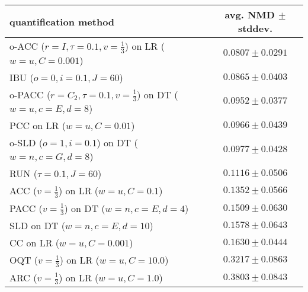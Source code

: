 \begin{tabular}{lc}
  \toprule
  quantification method & avg. NMD $\pm$ stddev. \\
  \midrule
  o-ACC ($r=I, \tau=0.1, v=\frac{1}{3}$) on LR ($w=u, C=0.001$) & $\mathbf{0.0807 \pm 0.0291}$ \\
  IBU ($o=0, i=0.1, J=60$) & $0.0865 \pm 0.0403$ \\
  o-PACC ($r=C_2, \tau=0.1, v=\frac{1}{3}$) on DT ($w=u, c=E, d=8$) & $0.0952 \pm 0.0377$ \\
  PCC on LR ($w=u, C=0.01$) & $0.0966 \pm 0.0439$ \\
  o-SLD ($o=1, i=0.1$) on DT ($w=n, c=G, d=8$) & $0.0977 \pm 0.0428$ \\
  RUN ($\tau=0.1, J=60$) & $0.1116 \pm 0.0506$ \\
  ACC ($v=\frac{1}{3}$) on LR ($w=u, C=0.1$) & $0.1352 \pm 0.0566$ \\
  PACC ($v=\frac{1}{3}$) on DT ($w=n, c=E, d=4$) & $0.1509 \pm 0.0630$ \\
  SLD on DT ($w=n, c=E, d=10$) & $0.1578 \pm 0.0643$ \\
  CC on LR ($w=u, C=0.001$) & $0.1630 \pm 0.0444$ \\
  OQT ($v=\frac{1}{3}$) on LR ($w=u, C=10.0$) & $0.3217 \pm 0.0863$ \\
  ARC ($v=\frac{1}{3}$) on LR ($w=u, C=1.0$) & $0.3803 \pm 0.0843$ \\
  \bottomrule
\end{tabular}
